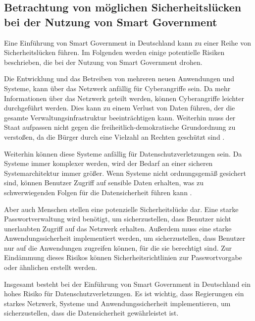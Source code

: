 \subsection{Betrachtung von möglichen Sicherheitslücken bei der Nutzung von Smart Government}
Eine Einführung von Smart Government in Deutschland kann zu einer Reihe von Sicherheitslücken führen.
Im Folgenden werden einige potentielle Risiken beschrieben, die bei der Nutzung von Smart \mbox{Government} drohen.
\par
Die Entwicklung und das Betreiben von mehreren neuen Anwendungen und Systeme, kann über das Netzwerk anfällig für Cyberangriffe sein.
Da mehr Informationen über das Netzwerk geteilt werden, können Cyberangriffe leichter durchgeführt werden.
Dies kann zu einem Verlust von Daten führen, der die gesamte Verwaltungsinfrastruktur beeinträchtigen kann.
Weiterhin muss der Staat aufpassen nicht gegen die freiheitlich-demokratische Grundordnung zu verstoßen, da die Bürger durch eine Vielzahl an Rechten geschützt sind \citep[Vgl.][S. 179]{von_Lucke_2016}.
\par
Weiterhin können diese Systeme anfällig für Datenschutzverletzungen sein.
Da Systeme immer komplexer werden, wird der Bedarf an einer sicheren Systemarchitektur immer größer.
Wenn Systeme nicht ordnungsgemäß gesichert sind, können Benutzer Zugriff auf sensible Daten erhalten, was zu schwerwiegenden Folgen für die Datensicherheit führen kann \citep[Vgl.][]{von_Lucke_2016}.
\par
Aber auch Menschen stellen eine potenzielle Sicherheitslücke dar.
Eine starke Passwortverwaltung wird benötigt, um sicherzustellen, dass Benutzer nicht unerlaubten Zugriff auf das Netzwerk erhalten.
Außerdem muss eine starke Anwendungssicherheit implementiert werden, um sicherzustellen, dass Benutzer nur auf die Anwendungen zugreifen können, für die sie berechtigt sind.
Zur Eindämmung dieses Risikos können Sicherheitsrichtlinien zur Passwortvorgabe oder ähnlichen erstellt werden.
\par
Insgesamt besteht bei der Einführung von Smart Government in Deutschland ein hohes Risiko für Datenschutzverletzungen.
Es ist wichtig, dass Regierungen ein starkes Netzwerk, Systeme und Anwendungssicherheit implementieren, um sicherzustellen, dass die Datensicherheit gewährleistet ist.
